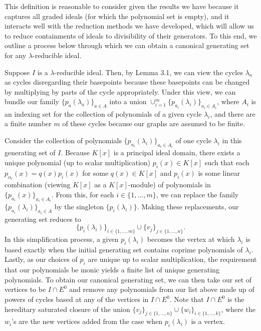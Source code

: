 \documentclass[12pt]{amsart}
\theoremstyle{plain} \numberwithin{equation}{section}
\theoremstyle{definition}
\theoremstyle{definition}
\begin{document}
This definition is reasonable to consider given the results we have because it captures all graded ideals (for which the polynomial set is empty), and it interacts well with the reduction methods we have developed, which will allow us to reduce containments of ideals to divisibility of their generators. To this end, we outline a process below through which we can obtain a canonical generating set for any $\lambda$-reducible ideal. 

Suppose $I$ is a $\lambda$-reducible ideal. Then, by Lemma 3.1, we can view the cycles $\lambda_a$ as cycles disregarding their basepoints because these basepoints can be changed by multiplying by parts of the cycle appropriately. Under this view, we can bundle our family $\{ p_a (\lambda_a) \}_{a\in A}$ into a union $\cup_{i=1}^m \{p_{a_i}(\lambda_i)\}_{a_i\in A_i}$, where $A_i$ is an indexing set for the collection of polynomials of a given cycle $\lambda_i$, and there are a finite number $m$ of these cycles because our graphs are assumed to be finite. 
    
Consider the collection of polynomials $\{p_{a_i}(\lambda_i)\}_{a_i \in A_i}$ of one cycle $\lambda_i$ in this generating set of $I$. Because $K[x]$ is a principal ideal domain, there exists a unique polynomial (up to scalar multiplication) $p_i(x)\in K[x]$ such that each $p_{\alpha_i}(x) = q(x)p_i(x)$ for some $q(x)\in K[x]$ and $p_i(x)$ is some linear combination (viewing $K[x]$ as a $K[x]$-module) of polynomials in $\{p_{a_i}(x)\}_{a_i\in A_i}$. From this, for each $i\in\{1,\dots ,m\}$, we can replace the family $\{p_{a_i}(\lambda_i)\}_{a_i\in A}$ by the singleton $\{p_i(\lambda_i)\}$. Making these replacements, our generating set reduces to $$\{p_i(\lambda_i)\}_{i\in\{1,\dots ,m\}} \cup \{v_j\}_{j\in\{1,\dots ,n\}}.$$ In this simplification process, a given $p_i(\lambda_i)$ becomes the vertex at which $\lambda_i$ is based exactly when the initial generating set contains coprime polynomials of $\lambda_i$. Lastly, as our choices of $p_i$ are unique up to scalar multiplication, the requirement that our polynomials be monic yields a finite list of unique generating polynomials. To obtain our canonical generating set, we can then take our set of vertices to be $I\cap E^0$ and remove any polynomials from our list above made up of powers of cycles based at any of the vertices in $I\cap E^0$. Note that $I\cap E^0$ is the hereditary saturated closure of the union $\{v_j\}_{j\in\{1,\dots ,n\}} \cup \{w_i\}_{i\in\{1,\dots ,k\}}$, where the $w_i$'s are the new vertices added from the case when $p_i(\lambda_i)$ is a vertex.\\
\end{document}
